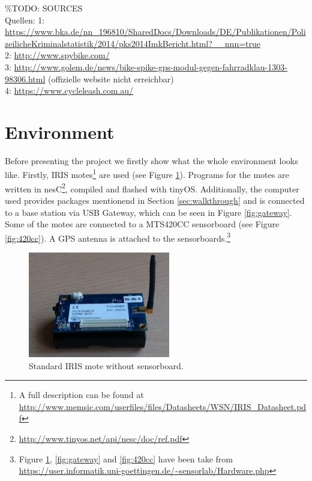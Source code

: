 \documentclass[a4paper]{article}
\begin{document}
\%TODO: SOURCES\\
Quellen:
1: \url{https://www.bka.de/nn_196810/SharedDocs/Downloads/DE/Publikationen/PolizeilicheKriminalstatistik/2014/pks2014ImkBericht.html?__nnn=true}\\
2:
\url{http://www.spybike.com/}\\
3:
\url{http://www.golem.de/news/bike-spike-gps-modul-gegen-fahrradklau-1303-98306.html}
(offizielle website nicht erreichbar)\\
4:
\url{https://www.cycleleash.com.au/}\\

\section{Environment}
Before presenting the project we firstly show what the whole environment looks like. Firstly, IRIS motes\footnote{A full description can be found at \url{http://www.memsic.com/userfiles/files/Datasheets/WSN/IRIS_Datasheet.pdf}} are used (see Figure \ref{fig:mote}). Programs for the motes are written in nesC\footnote{\url{http://www.tinyos.net/api/nesc/doc/ref.pdf}}, compiled and flashed with tinyOS. Additionally, the computer used provides packages mentionend in Section \ref{sec:walkthrough} and is connected to a base station via USB Gateway, which can be seen in Figure \ref{fig:gateway}. Some of the motes are connected to a MTS420CC sensorboard (see Figure \ref{fig:420cc}). A GPS antenna is attached to the sensorboards.\footnote{Figure \ref{fig:mote}, \ref{fig:gateway} and \ref{fig:420cc} have been take from \url{https://user.informatik.uni-goettingen.de/~sensorlab/Hardware.php}}
\begin{figure}[h!]
\begin{center}
\includegraphics[scale=0.75]{pics/mote.jpg}
\caption{Standard IRIS mote without sensorboard.}
\label{fig:mote}
\end{center}
\end{figure}
\end{document}
